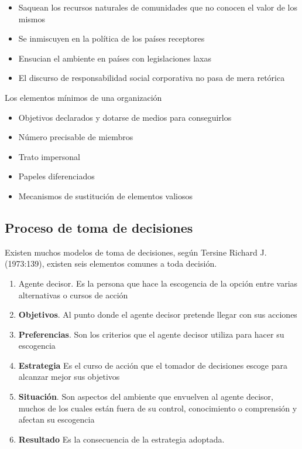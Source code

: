 \begin{center}
\end{center}
\begin{itemize}
    \item Saquean los recursos naturales de comunidades que no conocen el valor de los mismos
    \item Se inmiscuyen en la política de los países receptores
    \item Ensucian el ambiente en países con legislaciones laxas
    \item El discurso de responsabilidad social corporativa no pasa de mera retórica
\end{itemize}
Los elementos mínimos de una organización
\begin{itemize}
    \item Objetivos declarados y dotarse de medios para conseguirlos
    \item Número precisable de miembros
    \item Trato impersonal
    \item Papeles diferenciados
    \item Mecanismos de sustitución de elementos valiosos
\end{itemize}
\subsection{Proceso de toma de decisiones}
Existen muchos modelos de toma de decisiones, según Tersine Richard J. (1973:139), existen seis elementos comunes a toda decisión.
\begin{enumerate}
    \item Agente decisor. Es la persona que hace la escogencia de la opción entre varias alternativas o cursos de acción
    \item \textbf{Objetivos}. Al punto donde el agente decisor pretende llegar con sus acciones
    \item \textbf{Preferencias}. Son los criterios que el agente decisor utiliza para hacer su escogencia
    \item \textbf{Estrategia} Es el curso de acción que el tomador de decisiones escoge para alcanzar mejor sus objetivos
    \item \textbf{Situación}. Son aspectos del ambiente que envuelven al agente decisor, muchos de los cuales están fuera de su control, conocimiento o comprensión y afectan su escogencia
    \item \textbf{Resultado} Es la consecuencia de la estrategia adoptada.
\end{enumerate}
